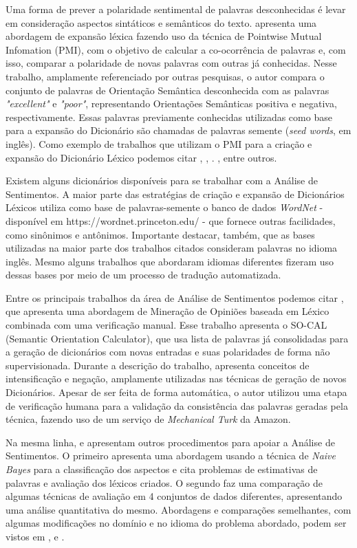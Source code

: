 \documentclass[a4paper,11pt]{article}
\begin{document}
Uma forma de prever a polaridade sentimental de palavras desconhecidas é levar em consideração aspectos sintáticos e semânticos do texto. \cite{Turney2002} apresenta uma abordagem de expansão léxica fazendo uso da técnica de Pointwise Mutual Infomation (PMI), com o objetivo de calcular a co-ocorrência de palavras e, com isso, comparar a polaridade de novas palavras com outras já conhecidas. Nesse trabalho, amplamente referenciado por outras pesquisas, o autor compara o conjunto de palavras de Orientação Semântica desconhecida com as palavras \emph{ "excellent"} e \emph{"poor"}, representando Orientações Semânticas positiva e negativa, respectivamente. Essas palavras previamente conhecidas utilizadas como base para a expansão do Dicionário são chamadas de palavras semente (\emph{seed words}, em inglês). Como exemplo de trabalhos que utilizam o PMI para a criação e expansão do Dicionário Léxico podemos citar \cite{becker2013}, \cite{Zhou2014}, \cite{Pinto2007}. \cite{Pantel2006}, entre outros.

Existem alguns dicionários disponíveis para se trabalhar com a Análise de Sentimentos. A maior parte das estratégias de criação e expansão de Dicionários Léxicos utiliza como base de palavras-semente o banco de dados \emph{WordNet} - disponível em https://wordnet.princeton.edu/ - que fornece outras facilidades, como sinônimos e antônimos. Importante destacar, também, que as bases utilizadas na maior parte dos trabalhos citados consideram palavras no idioma inglês. Mesmo alguns trabalhos que abordaram idiomas diferentes fizeram uso dessas bases por meio de um processo de tradução automatizada.

Entre os principais trabalhos da área de Análise de Sentimentos podemos citar \cite{taboada2011lexicon}, que apresenta uma abordagem de Mineração de Opiniões baseada em Léxico combinada com uma verificação manual. Esse trabalho apresenta o SO-CAL (Semantic Orientation Calculator), que usa lista de palavras já consolidadas para a geração de dicionários com novas entradas e suas polaridades de forma não supervisionada. Durante a descrição do trabalho, apresenta conceitos de intensificação e negação, amplamente utilizadas nas técnicas de geração de novos Dicionários. Apesar de ser feita de forma automática, o autor utilizou uma etapa de verificação humana para a validação da consistência das palavras geradas pela técnica, fazendo uso de um serviço de\emph{ Mechanical Turk} da Amazon. 

Na mesma linha, \cite{eisenstein2016unsupervised} e \cite{bandhakavi2016lexicon} apresentam outros procedimentos para apoiar a Análise de Sentimentos. O primeiro apresenta uma abordagem usando a técnica de \emph{Naive Bayes} para a classificação dos aspectos e cita problemas de estimativas de palavras e avaliação dos léxicos criados. O segundo faz uma comparação de algumas técnicas de avaliação em 4 conjuntos de dados diferentes, apresentando uma análise quantitativa do mesmo. Abordagens e comparações semelhantes, com algumas modificações no domínio e no idioma do problema abordado, podem ser vistos em \cite{khoo2017lexicon}, \cite{asghar2014review} e \cite{ding2008holistic}.
\end{document}
